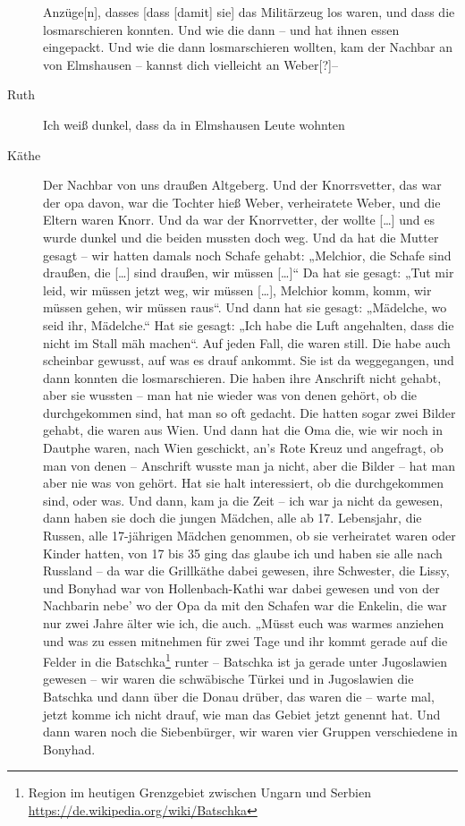 \documentclass[ngerman,]{article}
\begin{document}
\begin{multicols}{2}
\begin{description}
Anzüge{[}n{]}, dasses {[}dass {[}damit{]} sie{]} das Militärzeug los
waren, und dass die losmarschieren konnten. Und wie die dann – und hat
ihnen essen eingepackt. Und wie die dann losmarschieren wollten, kam der
Nachbar an von Elmshausen – kannst dich vielleicht an Weber{[}?{]}–
\item[Ruth]
Ich weiß dunkel, dass da in Elmshausen Leute wohnten
\item[Käthe]
Der Nachbar von uns draußen Altgeberg. Und der Knorrsvetter, das war der
opa davon, war die Tochter hieß Weber, verheiratete Weber, und die
Eltern waren Knorr. Und da war der Knorrvetter, der wollte
{[}\ldots{}{]} und es wurde dunkel und die beiden mussten doch weg. Und
da hat die Mutter gesagt – wir hatten damals noch Schafe gehabt:
„Melchior, die Schafe sind draußen, die {[}\ldots{}{]} sind draußen, wir
müssen {[}\ldots{}{]}“ Da hat sie gesagt: „Tut mir leid, wir müssen
jetzt weg, wir müssen {[}\ldots{}{]}, Melchior komm, komm, wir müssen
gehen, wir müssen raus“. Und dann hat sie gesagt: „Mädelche, wo seid
ihr, Mädelche.“ Hat sie gesagt: „Ich habe die Luft angehalten, dass die
nicht im Stall mäh machen“. Auf jeden Fall, die waren still. Die habe
auch scheinbar gewusst, auf was es drauf ankommt. Sie ist da
weggegangen, und dann konnten die losmarschieren. Die haben ihre
Anschrift nicht gehabt, aber sie wussten – man hat nie wieder was von
denen gehört, ob die durchgekommen sind, hat man so oft gedacht. Die
hatten sogar zwei Bilder gehabt, die waren aus Wien. Und dann hat die
Oma die, wie wir noch in Dautphe waren, nach Wien geschickt, an's Rote
Kreuz und angefragt, ob man von denen – Anschrift wusste man ja nicht,
aber die Bilder – hat man aber nie was von gehört. Hat sie halt
interessiert, ob die durchgekommen sind, oder was. Und dann, kam ja die
Zeit – ich war ja nicht da gewesen, dann haben sie doch die jungen
Mädchen, alle ab 17. Lebensjahr, die Russen, alle 17-jährigen Mädchen
genommen, ob sie verheiratet waren oder Kinder hatten, von 17 bis 35
ging das glaube ich und haben sie alle nach Russland – da war die
Grillkäthe dabei gewesen, ihre Schwester, die Lissy, und Bonyhad war von
Hollenbach-Kathi war dabei gewesen und von der Nachbarin nebe' wo der
Opa da mit den Schafen war die Enkelin, die war nur zwei Jahre älter wie
ich, die auch. „Müsst euch was warmes anziehen und was zu essen
mitnehmen für zwei Tage und ihr kommt gerade auf die Felder in die
Batschka\footnote{Region im heutigen Grenzgebiet zwischen Ungarn und
  Serbien \url{https://de.wikipedia.org/wiki/Batschka}} runter –
Batschka ist ja gerade unter Jugoslawien gewesen – wir waren die
schwäbische Türkei und in Jugoslawien die Batschka und dann über die
Donau drüber, das waren die – warte mal, jetzt komme ich nicht drauf,
wie man das Gebiet jetzt genennt hat. Und dann waren noch die
Siebenbürger, wir waren vier Gruppen verschiedene in Bonyhad.
\end{description}


\end{multicols}
\end{document}
